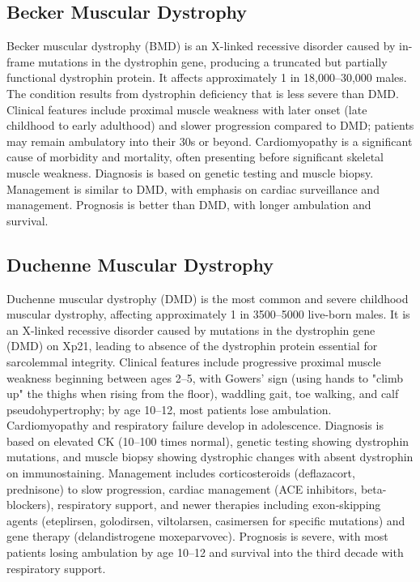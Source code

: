 \subsection{Becker Muscular Dystrophy}
\label{sec:Becker Muscular Dystrophy}
Becker muscular dystrophy (BMD) is an X-linked recessive disorder caused by in-frame mutations in the dystrophin gene, producing a truncated but partially functional dystrophin protein. It affects approximately 1 in 18,000--30,000 males. The condition results from dystrophin deficiency that is less severe than DMD. Clinical features include proximal muscle weakness with later onset (late childhood to early adulthood) and slower progression compared to DMD; patients may remain ambulatory into their 30s or beyond. Cardiomyopathy is a significant cause of morbidity and mortality, often presenting before significant skeletal muscle weakness. Diagnosis is based on genetic testing and muscle biopsy. Management is similar to DMD, with emphasis on cardiac surveillance and management. Prognosis is better than DMD, with longer ambulation and survival.

\subsection{Duchenne Muscular Dystrophy}
\label{sec:Duchenne Muscular Dystrophy}
Duchenne muscular dystrophy (DMD) is the most common and severe childhood muscular dystrophy, affecting approximately 1 in 3500--5000 live-born males. It is an X-linked recessive disorder caused by mutations in the dystrophin gene (DMD) on Xp21, leading to absence of the dystrophin protein essential for sarcolemmal integrity. Clinical features include progressive proximal muscle weakness beginning between ages 2--5, with Gowers' sign (using hands to "climb up" the thighs when rising from the floor), waddling gait, toe walking, and calf pseudohypertrophy; by age 10--12, most patients lose ambulation. Cardiomyopathy and respiratory failure develop in adolescence. Diagnosis is based on elevated CK (10--100 times normal), genetic testing showing dystrophin mutations, and muscle biopsy showing dystrophic changes with absent dystrophin on immunostaining. Management includes corticosteroids (deflazacort, prednisone) to slow progression, cardiac management (ACE inhibitors, beta-blockers), respiratory support, and newer therapies including exon-skipping agents (eteplirsen, golodirsen, viltolarsen, casimersen for specific mutations) and gene therapy (delandistrogene moxeparvovec). Prognosis is severe, with most patients losing ambulation by age 10--12 and survival into the third decade with respiratory support.

